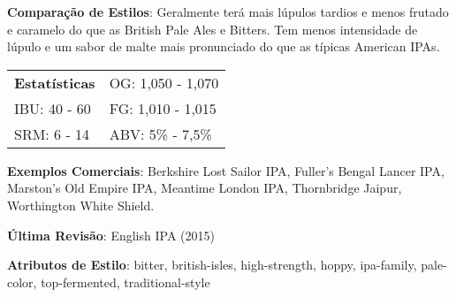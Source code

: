 \textbf{Comparação de Estilos}: Geralmente terá mais lúpulos tardios e menos frutado e caramelo do que as British Pale Ales e Bitters. Tem menos intensidade de lúpulo e um sabor de malte mais pronunciado do que as típicas American IPAs.

\begin{tabular}{@{}p{35mm}p{35mm}@{}}
  \textbf{Estatísticas} & OG: 1,050 - 1,070 \\
  IBU: 40 - 60  & FG: 1,010 - 1,015  \\
  SRM: 6 - 14  & ABV: 5\% - 7,5\%
\end{tabular}

\textbf{Exemplos Comerciais}: Berkshire Lost Sailor IPA, Fuller's Bengal Lancer IPA, Marston’s Old Empire IPA, Meantime London IPA, Thornbridge Jaipur, Worthington White Shield.

\textbf{Última Revisão}: English IPA (2015)

\textbf{Atributos de Estilo}: bitter, british-isles, high-strength, hoppy, ipa-family, pale-color, top-fermented, traditional-style
